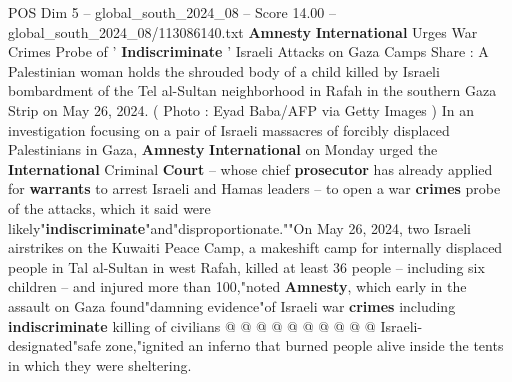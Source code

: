 \begin{textsample}{POS Dim 5 – global\_south\_2024\_08 – Score 14.00 – global\_south\_2024\_08/113086140.txt}  \label{ex:f5_pos_282}
\textbf{Amnesty} \textbf{International} Urges War Crimes Probe of ' \textbf{Indiscriminate} ' Israeli Attacks on Gaza Camps Share : A Palestinian woman holds the shrouded body of a child killed by Israeli bombardment of the Tel al-Sultan neighborhood in Rafah in the southern Gaza Strip on May 26, 2024. ( Photo : Eyad Baba/AFP via Getty Images ) In an investigation focusing on a pair of Israeli massacres of forcibly displaced Palestinians in Gaza, \textbf{Amnesty} \textbf{International} on Monday urged the \textbf{International} Criminal \textbf{Court} -- whose chief \textbf{prosecutor} has already applied for \textbf{warrants} to arrest Israeli and Hamas leaders -- to open a war \textbf{crimes} probe of the attacks, which it said were likely"\textbf{indiscriminate}"and"disproportionate.""On May 26, 2024, two Israeli airstrikes on the Kuwaiti Peace Camp, a makeshift camp for internally displaced people in Tal al-Sultan in west Rafah, killed at least 36 people -- including six children -- and injured more than 100,"noted \textbf{Amnesty}, which early in the assault on Gaza found"damning evidence"of Israeli war \textbf{crimes} including \textbf{indiscriminate} killing of civilians @ @ @ @ @ @ @ @ @ @ Israeli-designated"safe zone,"ignited an inferno that burned people alive inside the tents in which they were sheltering.

\end{textsample}
